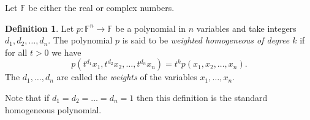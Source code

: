 \documentclass[12pt]{article}
\theoremstyle{theorem}
\theoremstyle{definition}
\newtheorem*{defn}{Definition}
\theoremstyle{remark}
\begin{document}
Let ${\mathbb{F}}$ be either the real or complex numbers.

\begin{defn}
Let $p \colon {\mathbb{F}}^n \to {\mathbb{F}}$ be a polynomial in $n$ variables 
and take integers $d_1, d_2, \ldots, d_n$.
The polynomial $p$ is said to be
{\em weighted homogeneous of degree $k$} if for all $t > 0$ we have
\begin{equation*}
p(t^{d_1} x_1,t^{d_2} x_2,\ldots,t^{d_n} x_n) = t^k p(x_1,x_2,\ldots,x_n) .
\end{equation*}
The $d_1,\ldots,d_n$ are called the {\em weights} of the variables $x_1,\ldots,x_n$.  
\end{defn}

Note that if $d_1 = d_2 = \ldots = d_n = 1$ then this definition is the standard homogeneous polynomial.
\end{document}
